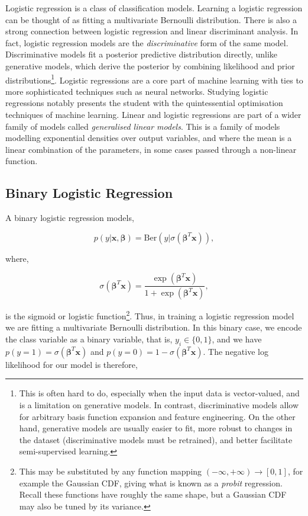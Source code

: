 \documentclass[11pt]{amsart}
\begin{document}
Logistic regression is a class of classification models. Learning a logistic regression can be thought of as fitting a multivariate Bernoulli distribution. There is also a strong connection between logistic regression and linear discriminant analysis. In fact, logistic regression models are the \emph{discriminative} form of the same model. Discriminative models fit a posterior predictive distribution directly, unlike generative models, which derive the posterior by combining likelihood and prior distributions\footnote{This is often hard to do, especially when the input data is vector-valued, and is a limitation on generative models. In contrast, discriminative models allow for arbitrary basis function expansion and feature engineering. On the other hand, generative models are usually easier to fit, more robust to changes in the dataset (discriminative models must be retrained), and better facilitate semi-supervised learning.}. Logistic regressions are a core part of machine learning with ties to more sophisticated techniques such as neural networks. Studying logistic regressions notably presents the student with the quintessential optimisation techniques of machine learning. Linear and logistic regressions are part of a wider family of models called \emph{generalised linear models}. This is a family of models modelling exponential densities over output variables, and where the mean is a linear combination of the parameters, in some cases passed through a non-linear function.

\subsection{Binary Logistic Regression}

A binary logistic regression models,

$$p(y|\mathbf{x}, \boldsymbol\beta) = \text{Ber}(y|\sigma(\boldsymbol\beta^T\mathbf{x})),$$

where,

$$\sigma(\boldsymbol\beta^T\mathbf{x}) = \frac{\exp(\boldsymbol\beta^T\mathbf{x})}{1 + \exp(\boldsymbol\beta^T\mathbf{x})},$$

is the sigmoid or logistic function\footnote{This may be substituted by any function mapping $(-\infty, +\infty) \to [0, 1]$, for example the Gaussian CDF, giving what is known as a \emph{probit} regression. Recall these functions have roughly the same shape, but a Gaussian CDF may also be tuned by its variance.}. Thus, in training a logistic regression model we are fitting a multivariate Bernoulli distribution. In this binary case, we encode the class variable as a binary variable, that is, $y_i \in \{0, 1\}$, and we have $p(y = 1) = \sigma(\boldsymbol\beta^T\mathbf{x})$ and $p(y = 0) = 1 - \sigma(\boldsymbol\beta^T\mathbf{x})$. The negative log likelihood for our model is therefore,
\end{document}
